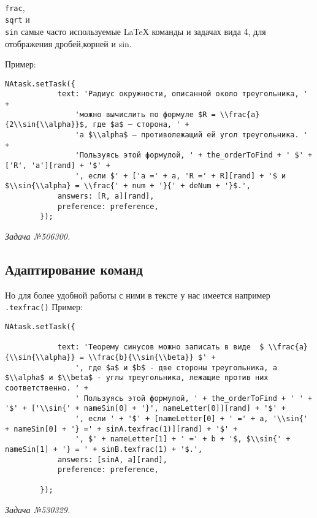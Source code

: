 \texttt{\\frac{}{}}, \texttt{\\sqrt{}} и \texttt{\\sin{}} 
самые часто используемые LaTeХ команды и задачах вида 4, для отображения дробей,корней и sin.

Пример:
\begin{lstlisting}
NAtask.setTask({
			text: 'Радиус окружности, описанной около треугольника, ' +
				'можно вычислить по формуле $R = \\frac{a}{2\\sin{\\alpha}}$, где $a$ – сторона, ' +
				'а $\\alpha$ – противолежащий ей угол треугольника. ' +
				'Пользуясь этой формулой, ' + the_orderToFind + ' $' + ['R', 'a'][rand] + '$' +
				', если $' + ['a =' + a, 'R =' + R][rand] + '$ и $\\sin{\\alpha} = \\frac{' + num + '}{' + deNum + '}$.',
			answers: [R, a][rand],
			preference: preference,
		});
\end{lstlisting}
\textsl{Задача №506300.}

\subsection{Адаптирование команд}
Но для более удобной работы с ними в тексте у нас имеется например \texttt{.texfrac()} 
Пример:
\begin{lstlisting}
NAtask.setTask({

			text: 'Теорему синусов можно записать в виде  $ \\frac{a}{\\sin{\\alpha}} = \\frac{b}{\\sin{\\beta}} $' +
				', где $a$ и $b$ - две стороны треугольника, а $\\alpha$ и $\\beta$ - углы треугольника, лежащие против них соответственно. ' +
				' Пользуясь этой формулой, ' + the_orderToFind + ' ' + '$' + ['\\sin{' + nameSin[0] + '}', nameLetter[0]][rand] + '$' +
				', если ' + '$' + [nameLetter[0] + ' =' + a, '\\sin{' + nameSin[0] + '} =' + sinA.texfrac(1)][rand] + '$' +
				', $' + nameLetter[1] + ' =' + b + '$, $\\sin{' + nameSin[1] + '} = ' + sinB.texfrac(1) + '$.',
			answers: [sinA, a][rand],
			preference: preference,

		});
\end{lstlisting}
\textsl{Задача №530329.}

